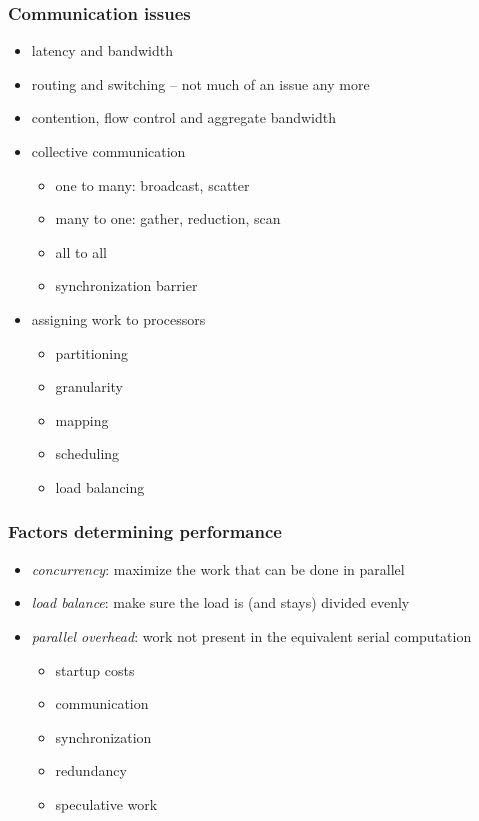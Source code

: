 \begin{frame}[fragile]
%
  \frametitle{Communication issues}
%
  \begin{itemize}
%
  \item latency and bandwidth
  \item routing and switching -- not much of an issue any more
  \item contention, flow control and aggregate bandwidth
  \item collective communication
    \begin{itemize}
      \item one to many: broadcast, scatter
      \item many to one: gather, reduction, scan
      \item all to all
      \item synchronization barrier
    \end{itemize}
  \item assigning work to processors
    \begin{itemize}
    \item partitioning
    \item granularity
    \item mapping
    \item scheduling
    \item load balancing
    \end{itemize}
%
  \end{itemize}
%
\end{frame}

\begin{frame}[fragile]
%
  \frametitle{Factors determining performance}
%
  \begin{itemize}
%
  \item {\em concurrency}: maximize the work that can be done in parallel
  \item {\em load balance}: make sure the load is (and stays) divided evenly
  \item {\em parallel overhead}: work not present in the equivalent serial computation
    \begin{itemize}
      \item startup costs
      \item communication
      \item synchronization
      \item redundancy
      \item speculative work
    \end{itemize}
%
  \end{itemize}
%
\end{frame}

